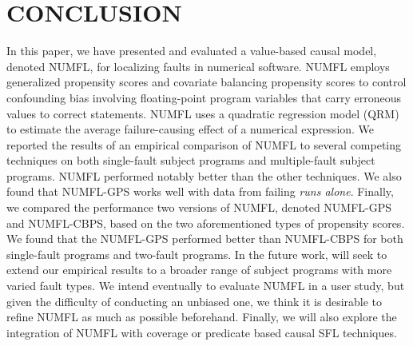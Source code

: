 \section{CONCLUSION}\label{conclusion}
In this paper, we have presented and evaluated a value-based causal model, denoted NUMFL, for localizing faults in numerical software. NUMFL employs generalized propensity scores and covariate balancing propensity scores to control confounding bias involving floating-point program variables that carry erroneous values to correct statements.  NUMFL uses a quadratic regression model (QRM) to estimate the average failure-causing effect of a numerical expression.  We reported the results of an empirical comparison of NUMFL to several competing techniques on both single-fault subject programs and multiple-fault subject programs.  NUMFL performed notably better than the other techniques. We also found that NUMFL-GPS works well with data from failing {\it runs alone}.  Finally, we compared the performance two versions of NUMFL, denoted NUMFL-GPS and NUMFL-CBPS, based on the two aforementioned types of propensity scores. We found that the NUMFL-GPS performed better than NUMFL-CBPS for both single-fault programs and two-fault programs.   In the future work, will seek to extend our empirical results to a broader range of subject programs with more varied fault types.  We intend eventually to evaluate NUMFL in a user study, but given the difficulty of conducting an unbiased one, we think it is desirable to refine NUMFL as much as possible beforehand.  Finally, we will also explore the integration of NUMFL with coverage or predicate based causal SFL techniques. 
